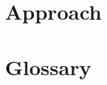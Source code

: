 \documentclass{grantplate}
\begin{document}

\cleardoublepage


\cleardoublepage




\section{Approach}






\clearpage
\section*{Glossary}
\printglossaries

\clearpage
\printbibliography
\end{document}
